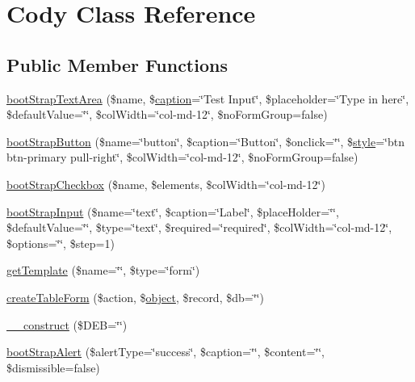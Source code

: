 \hypertarget{classCody}{}\section{Cody Class Reference}
\label{classCody}
\subsection*{Public Member Functions}
\begin{DoxyCompactItemize}
\item 
\hyperlink{classCody_aa2995d370fea29cedab1eed4dd166f8b}{boot\+Strap\+Text\+Area} (\$name, \$\hyperlink{Shape_8php_af310fcd32ca64d696b944cf99bf602ff}{caption}=\char`\"{}Test Input\char`\"{}, \$placeholder=\char`\"{}Type in here\char`\"{}, \$default\+Value=\char`\"{}\char`\"{}, \$col\+Width=\char`\"{}col-\/md-\/12\char`\"{}, \$no\+Form\+Group=false)
\item 
\hyperlink{classCody_a97155a3cb1c7b9e33e0d64229a8a6cbe}{boot\+Strap\+Button} (\$name=\char`\"{}button\char`\"{}, \$caption=\char`\"{}Button\char`\"{}, \$onclick=\char`\"{}\char`\"{}, \$\hyperlink{Shape_8php_aa43717795ebf0302891b9f9d9bf4ca9d}{style}=\char`\"{}btn btn-\/primary pull-\/right\char`\"{}, \$col\+Width=\char`\"{}col-\/md-\/12\char`\"{}, \$no\+Form\+Group=false)
\item 
\hyperlink{classCody_a45e229b7967b4e124471055f4b311a55}{boot\+Strap\+Checkbox} (\$name, \$elements, \$col\+Width=\char`\"{}col-\/md-\/12\char`\"{})
\item 
\hyperlink{classCody_a22dc3bebf4ba3deec1837ab58f6bc209}{boot\+Strap\+Input} (\$name=\char`\"{}text\char`\"{}, \$caption=\char`\"{}Label\char`\"{}, \$place\+Holder=\char`\"{}\char`\"{}, \$default\+Value=\char`\"{}\char`\"{}, \$type=\char`\"{}text\char`\"{}, \$required=\char`\"{}required\char`\"{}, \$col\+Width=\char`\"{}col-\/md-\/12\char`\"{}, \$options=\char`\"{}\char`\"{}, \$step=1)
\item 
\hyperlink{classCody_a6a0695d4357474925cd6f42e5ce5b248}{get\+Template} (\$name=\char`\"{}\char`\"{}, \$type=\char`\"{}form\char`\"{})
\item 
\hyperlink{classCody_a6ffe5d421ef90aebaedeb33bcc6bcc3e}{create\+Table\+Form} (\$action, \$\hyperlink{Shape_8php_a774642dc290de09e3aff55c8b594113f}{object}, \$record, \$db=\char`\"{}\char`\"{})
\item 
\hyperlink{classCody_a55a918acdc624ced30d76711856475aa}{\+\_\+\+\_\+construct} (\$D\+E\+B=\char`\"{}\char`\"{})
\item 
\hyperlink{classCody_af81e612dbfec3bb1e5b205da1fa2e1db}{boot\+Strap\+Alert} (\$alert\+Type=\char`\"{}success\char`\"{}, \$caption=\char`\"{}\char`\"{}, \$content=\char`\"{}\char`\"{}, \$dismissible=false)

\end{DoxyCompactItemize}
